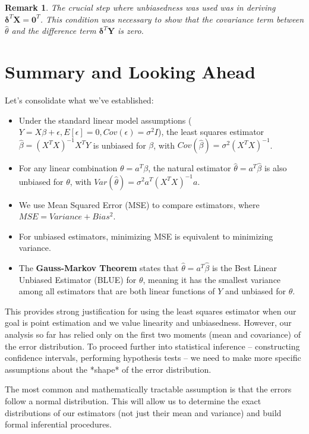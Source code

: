 \documentclass[11pt]{article}
\theoremstyle{mytheoremstyle}
\theoremstyle{mydefinitionstyle}
\newtheorem{remark}[theorem]{Remark}
\newcommand{\vect}[1]{\mathbf{#1}}
\begin{document}
\begin{remark}
The crucial step where unbiasedness was used was in deriving $\vect{\delta}^T \vect{X} = \vect{0}^T$. This condition was necessary to show that the covariance term between $\hat{\theta}$ and the difference term $\vect{\delta}^T \vect{Y}$ is zero.
\end{remark}

\section{Summary and Looking Ahead}

Let's consolidate what we've established:
\begin{itemize}
    \item Under the standard linear model assumptions ($Y = X\beta + \epsilon, E[\epsilon]=0, Cov(\epsilon)=\sigma^2 I$), the least squares estimator $\hat{\beta} = (X^T X)^{-1} X^T Y$ is unbiased for $\beta$, with $Cov(\hat{\beta}) = \sigma^2 (X^T X)^{-1}$.
    \item For any linear combination $\theta = a^T \beta$, the natural estimator $\hat{\theta} = a^T \hat{\beta}$ is also unbiased for $\theta$, with $Var(\hat{\theta}) = \sigma^2 a^T (X^T X)^{-1} a$.
    \item We use Mean Squared Error (MSE) to compare estimators, where $MSE = Variance + Bias^2$.
    \item For unbiased estimators, minimizing MSE is equivalent to minimizing variance.
    \item The \textbf{Gauss-Markov Theorem} states that $\hat{\theta} = a^T \hat{\beta}$ is the Best Linear Unbiased Estimator (BLUE) for $\theta$, meaning it has the smallest variance among all estimators that are both linear functions of $Y$ and unbiased for $\theta$.
\end{itemize}

This provides strong justification for using the least squares estimator when our goal is point estimation and we value linearity and unbiasedness. However, our analysis so far has relied only on the first two moments (mean and covariance) of the error distribution. To proceed further into statistical inference – constructing confidence intervals, performing hypothesis tests – we need to make more specific assumptions about the *shape* of the error distribution.

The most common and mathematically tractable assumption is that the errors follow a normal distribution. This will allow us to determine the exact distributions of our estimators (not just their mean and variance) and build formal inferential procedures.
\end{document}
